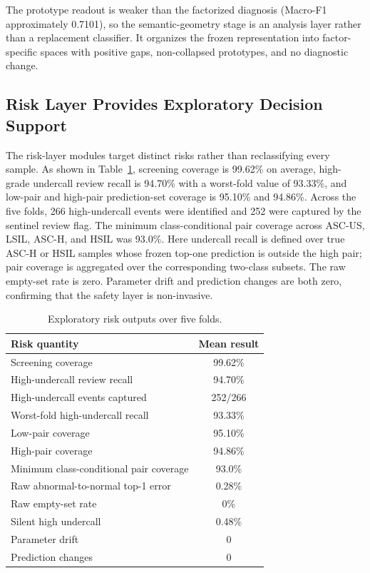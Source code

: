 \documentclass[conference]{IEEEtran}
\begin{document}
The prototype readout is weaker than the factorized diagnosis
(Macro-F1 approximately 0.7101), so the semantic-geometry stage is an
analysis layer rather than a replacement classifier. It organizes the
frozen representation into factor-specific spaces with positive gaps,
non-collapsed prototypes, and no diagnostic change.

\subsection{Risk Layer Provides Exploratory Decision Support}
The risk-layer modules target distinct risks rather than reclassifying
every sample. As shown in Table~\ref{tab:risk}, screening coverage is
99.62\% on average, high-grade undercall review recall is 94.70\% with a
worst-fold value of 93.33\%, and low-pair and high-pair prediction-set
coverage is 95.10\% and 94.86\%. Across the five folds, 266 high-undercall
events were identified and 252 were captured by the sentinel review flag.
The minimum class-conditional pair coverage across ASC-US, LSIL, ASC-H,
and HSIL was 93.0\%. Here undercall recall is defined over true ASC-H or
HSIL samples whose frozen top-one prediction is outside the high pair;
pair coverage is aggregated over the corresponding two-class subsets. The
raw empty-set rate is zero. Parameter drift and prediction changes are
both zero, confirming that the safety layer is non-invasive.

\begin{table}[!htbp]
\caption{Exploratory risk outputs over five folds.}
\label{tab:risk}
\centering
\footnotesize
\setlength{\tabcolsep}{3.0pt}
\begin{tabular}{lc}
\toprule
Risk quantity & Mean result \\
\midrule
Screening coverage & 99.62\% \\
High-undercall review recall & 94.70\% \\
High-undercall events captured & 252/266 \\
Worst-fold high-undercall recall & 93.33\% \\
Low-pair coverage & 95.10\% \\
High-pair coverage & 94.86\% \\
Minimum class-conditional pair coverage & 93.0\% \\
Raw abnormal-to-normal top-1 error & 0.28\% \\
Raw empty-set rate & 0\% \\
Silent high undercall & 0.48\% \\
Parameter drift & 0 \\
Prediction changes & 0 \\
\bottomrule
\end{tabular}
\end{table}
\end{document}
